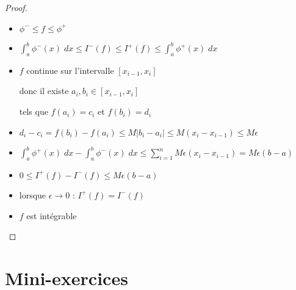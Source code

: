 \begin{frame}
\begin{proof}

\hfill
\begin{minipage}{0.4\textwidth}
\end{minipage}

\vspace*{-20mm}
\begin{itemize}
 \item $\phi^-\le f \le \phi^+$
\pause
  \item $\int_a^b \phi^-(x)\;dx \le I^-(f) \le I^+(f) \le \int_a^b \phi^+(x)\;dx$
\pause
  \item $f$ continue sur l'intervalle $[x_{i - 1}, x_i]$ 

donc il existe $a_i,b_i \in [x_{i -1},x_i]$ 

tels que $f(a_i)=c_i$ et $f(b_i)=d_i$
\pause
  \item $d_i-c_i = f(b_i) - f(a_i) \le M |b_i - a_i| \le M (x_i-x_{i-1}) \le M\epsilon$
\pause
  \item  $\int_a^b \phi^+(x)\;dx - \int_a^b \phi^-(x)\;dx \le \sum_{i=1}^n M\epsilon(x_i-x_{i-1})=M\epsilon(b-a)$
\pause
   \item $0 \le I^+(f) - I^-(f) \le M\epsilon(b-a)$
\pause
  \item lorsque $\epsilon \to 0$ : $I^+(f) = I^-(f)$
\pause
  \item  $f$ est intégrable 
\end{itemize}
\end{proof}
\end{frame}





\section*{Mini-exercices}


